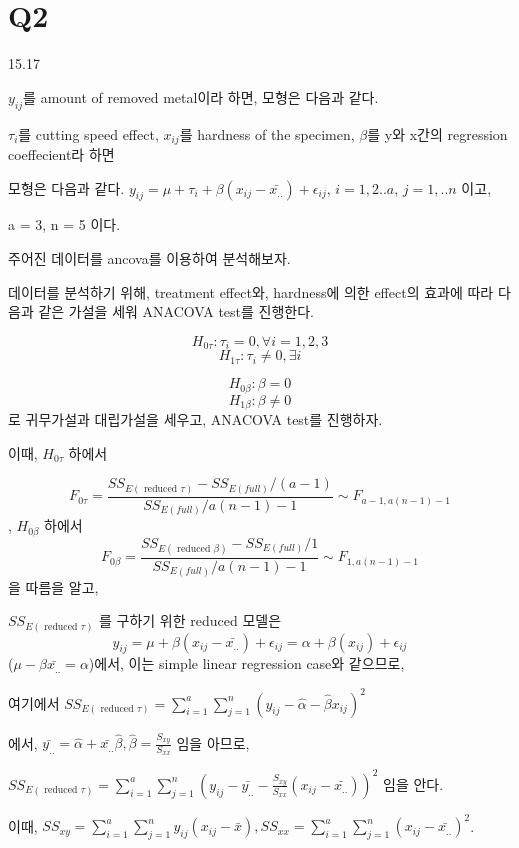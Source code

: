 \documentclass{article}
\begin{document}
\section{Q2} 

15.17


$y_{ij}$를 amount of removed metal이라 하면, 모형은 다음과 같다.

$\tau_i$를 cutting speed effect, $x_{ij}$를 hardness of the specimen, $\beta$를 y와 x간의 regression coeffecient라 하면

모형은 다음과 같다. 
$y_{ij} = \mu + \tau_i + \beta(x_{ij} - \bar{x_{..}}) +  \epsilon_{ij}$, $i = 1,2.. a$, $j = 1, .. n$ 이고,

a = 3, n = 5 이다.

주어진 데이터를 ancova를 이용하여 분석해보자.

데이터를 분석하기 위해, treatment effect와, hardness에 의한 effect의 효과에 따라 다음과 같은 가설을 세워 ANACOVA test를 진행한다.

$$H_{0\tau} :  \tau_i = 0, \forall i = 1, 2, 3$$ 
$$H_{1\tau} :  \tau_i \neq 0, \exists i$$ 

$$H_{0\beta} :  \beta = 0$$ 
$$H_{1\beta} :  \beta \neq 0$$ 
로 귀무가설과 대립가설을 세우고, ANACOVA test를 진행하자.

이때, $H_{0\tau}$ 하에서 

$$F_{0\tau}=\frac{S S_{E(\text { reduced } \tau)}-S S_{E(f u l l)} /(a-1)}{S S_{E(f u l l)} / a(n-1)-1} \sim  F_{a-1, a(n-1) - 1}$$,
$H_{0\beta}$ 하에서
$$F_{0\beta}=\frac{S S_{E(\text { reduced } \beta)}-S S_{E(f u l l)} /1}{S S_{E(f u l l)} / a(n-1)-1} \sim  F_{1, a(n-1) - 1}$$ 을 따름을 알고,

$SS_{E(\text { reduced } \tau)}$ 를 구하기 위한 reduced 모델은
$$y_{ij} = \mu +  \beta(x_{ij} - \bar{x_{..}}) +  \epsilon_{ij} = \alpha + \beta(x_{ij}) + \epsilon_{ij}$$
($\mu - \beta \bar{x_{..}} = \alpha$)에서, 이는 simple linear regression case와 같으므로,


여기에서  $SS_{E(\text { reduced } \tau )} = \sum_{i=1}^a \sum_{j=1}^n (y_{ij} - \hat{\alpha} - \hat{\beta}x_{ij})^2$

에서, $\bar{y_{..}} = \hat{\alpha} + \bar{x_{..}} \hat{\beta}, \hat{\beta} = \frac{S_{xy}}{S_{xx}}$ 임을 아므로,

$SS_{E(\text{ reduced } \tau)}  = \sum_{i=1}^a \sum_{j=1}^n (y_{ij} - \bar{y_{..}} -  \frac{S_{xy}}{S_{xx}}(x_{ij} - \bar{x_{..}}))^2$ 임을 안다.

이때, $SS_{xy} = \sum_{i=1}^a \sum_{j=1}^n y_{ij}(x_{ij} - \bar{x}),SS_{xx} = \sum_{i=1}^a \sum_{j=1}^n (x_{ij} - \bar{x_{..}}) ^2$.
\end{document}

